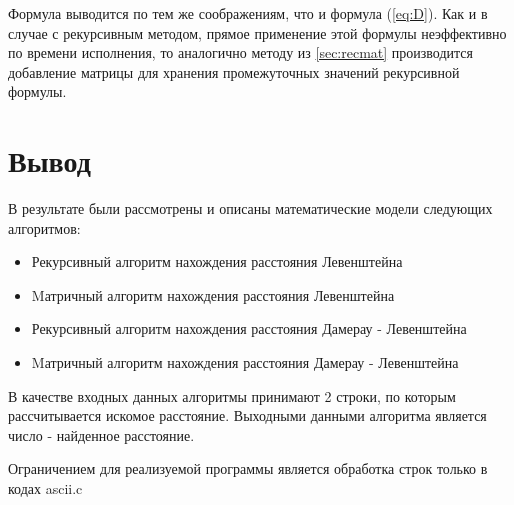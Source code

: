         Формула выводится по тем же соображениям, что и формула (\ref{eq:D}).
        Как и в случае с рекурсивным методом, прямое применение этой формулы неэффективно по времени исполнения, то аналогично методу из \ref{sec:recmat} производится добавление матрицы для хранения промежуточных значений рекурсивной формулы.
    
    \section*{Вывод}
    
        В результате были рассмотрены и описаны математические модели следующих алгоритмов:
        
        \begin{itemize}
            \item Рекурсивный алгоритм нахождения расстояния Левенштейна
            \item Mатричный алгоритм нахождения расстояния Левенштейна
            \item Рекурсивный алгоритм нахождения расстояния Дамерау - Левенштейна
            \item Mатричный алгоритм нахождения расстояния Дамерау - Левенштейна
        \end{itemize}
        
        В качестве входных данных алгоритмы принимают 2 строки, по которым рассчитывается искомое расстояние. Выходными данными алгоритма является число - найденное расстояние.
        
        Ограничением для реализуемой программы является обработка строк только в кодах ascii.c